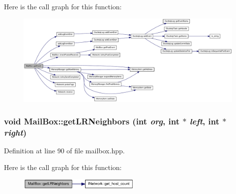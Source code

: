 Here is the call graph for this function:\nopagebreak
\begin{figure}[H]
\begin{center}
\leavevmode
\includegraphics[width=420pt]{class_mail_box_ad920ff9b804620414e814322462c783b_cgraph}
\end{center}
\end{figure}
\hypertarget{class_mail_box_a1fb17b7247e23d29fc0f51e980717acf}{
\subsubsection[{getLRNeighbors}]{\setlength{\rightskip}{0pt plus 5cm}void MailBox::getLRNeighbors (int {\em org}, \/  int $\ast$ {\em left}, \/  int $\ast$ {\em right})}}
\label{class_mail_box_a1fb17b7247e23d29fc0f51e980717acf}


Definition at line 90 of file mailbox.hpp.

Here is the call graph for this function:\nopagebreak
\begin{figure}[H]
\begin{center}
\leavevmode
\includegraphics[width=169pt]{class_mail_box_a1fb17b7247e23d29fc0f51e980717acf_cgraph}
\end{center}
\end{figure}



